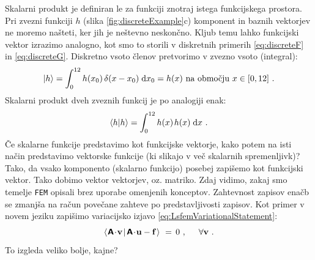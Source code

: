 Skalarni produkt je definiran le za funkciji znotraj istega funkcijskega prostora. Pri zvezni funkciji $h$ (slika \ref{fig:discreteExample}c) komponent in baznih vektorjev ne moremo našteti, ker jih je neštevno neskončno. Kljub temu lahko funkcijski vektor izrazimo analogno, kot smo to storili v diskretnih primerih \eqref{eq:discreteF} in \eqref{eq:discreteG}. Diskretno vsoto členov pretvorimo v zvezno vsoto (integral):
\begin{equation}
   \ket{h} = \int_{0}^{12} h(x_0) \mkern3mu \delta(x-x_0) \mkern5mu \text{d}x_0 = h(x) \text{ na območju } x \in [0, 12] \ .
\end{equation}
Skalarni produkt dveh zveznih funkcij je po analogiji enak:
\begin{equation}
   \bra{h}\ket{h} =
   \int_0^{12} h(x) \mkern2mu h(x) \mkern5mu \text{d}x \ .
\end{equation}
Če skalarne funkcije predstavimo kot funkcijske vektorje, kako potem na isti način predstavimo vektorske funkcije (ki slikajo v več skalarnih spremenljivk)? Tako, da vsako komponento (skalarno funkcijo) posebej zapišemo kot funkcijski vektor. Tako dobimo vektor vektorjev, oz. matriko. Zdaj vidimo, zakaj smo temelje \texttt{FEM} opisali brez uporabe omenjenih konceptov. Zahtevnost zapisov enačb se zmanjša na račun povečane zahteve po predstavljivosti zapisov. Kot primer v novem jeziku zapišimo variacijsko izjavo \eqref{eq:LsfemVariationalStatement}:
\begin{equation}
		\bra{\mkern1mu \bm{\mathsf{A}} \! \cdot \! \mathbf{v} \mkern2mu}\ket{\mkern2mu \bm{\mathsf{A}} \! \cdot \! \mathbf{u} - \mathbf{f}\mkern1mu} \ = \,
		0 \ , \hspace{5mm} \forall \mathbf{v} \ .
	\label{eq:LsfemVariationalStatementNew}
\end{equation}
To izgleda veliko bolje, kajne?

